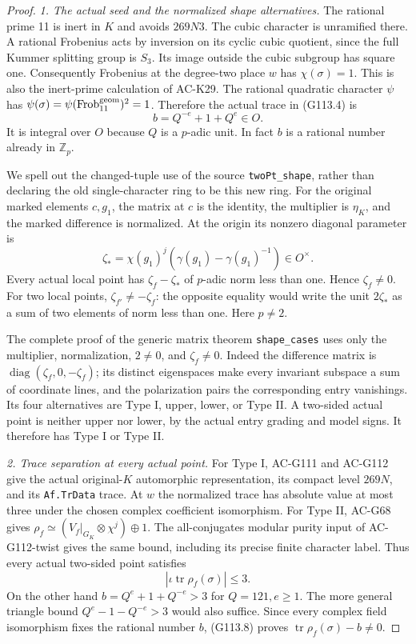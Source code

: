 \begin{proof}
\emph{1. The actual seed and the normalized shape alternatives.}
The rational prime 11 is inert in \(K\) and avoids \(269N3\).
The cubic character is unramified there.  A rational Frobenius
acts by inversion on its cyclic cubic quotient, since the full
Kummer splitting group is \(S_3\).  Its image outside the cubic
subgroup has square one.  Consequently Frobenius at the degree-two
place \(w\) has \(\chi(\sigma)=1\).  This is also the inert-prime
calculation of AC-K29.  The rational quadratic character \(\psi\)
has \(\psi(\sigma)=\psi(\mathrm{Frob}^{\rm geom}_{11})^2=1\).
Therefore the actual trace in (G113.4) is
\[
                   b=Q^{-e}+1+Q^e\in O.
 \tag{G113.6}
\]
It is integral over \(O\) because \(Q\) is a \(p\)-adic unit.
In fact \(b\) is a rational number already in \(\mathbb Z_p\).

We spell out the changed-tuple use of the source
\texttt{twoPt\_shape}, rather than declaring the old single-character
ring to be this new ring.  For the original marked elements \(c,g_1\),
the matrix at \(c\) is the identity, the multiplier is \(\eta_K\),
and the marked difference is normalized.  At the origin its nonzero
diagonal parameter is
\[
        \zeta_*=\chi(g_1)^j
                         (\gamma(g_1)-\gamma(g_1)^{-1})\in O^\times.
 \tag{G113.7}
\]
Every actual local point has \(\zeta_f-\zeta_*\) of \(p\)-adic
norm less than one.  Hence \(\zeta_f\ne0\).  For two local
points, \(\zeta_{f'}\ne-\zeta_f\): the opposite equality would
write the unit \(2\zeta_*\) as a sum of two elements of norm
less than one.  Here \(p\ne2\).

The complete proof of the generic matrix theorem
\texttt{shape\_cases} uses only the multiplier, normalization,
\(2\ne0\), and \(\zeta_f\ne0\).  Indeed the difference matrix
is \(\operatorname{diag}(\zeta_f,0,-\zeta_f)\); its distinct
eigenspaces make every invariant subspace a sum of
coordinate lines, and the polarization pairs the corresponding
entry vanishings.  Its four alternatives are Type I, upper,
lower, or Type II.  A two-sided actual point is neither upper
nor lower, by the actual entry grading and model signs.
It therefore has Type I or Type II.

\emph{2. Trace separation at every actual point.}
For Type I, AC-G111 and AC-G112 give the actual
original-\(K\) automorphic representation, its compact level
\(269N\), and its \texttt{Af.TrData} trace.  At \(w\) the
normalized trace has absolute value at most three under the
chosen complex coefficient isomorphism.  For Type II, AC-G68
gives \(\rho_f\simeq(V_f|_{G_K}\otimes\chi^j)\oplus1\).
The all-conjugates modular purity input of AC-G112-twist gives
the same bound, including its precise finite character label.
Thus every actual two-sided point satisfies
\[
           |\iota\operatorname{tr}\rho_f(\sigma)|\le3.
 \tag{G113.8}
\]
On the other hand \(b=Q^e+1+Q^{-e}>3\) for \(Q=121,e\ge1\).
The more general triangle bound \(Q^e-1-Q^{-e}>3\) would
also suffice.  Since every complex field isomorphism fixes the
rational number \(b\), (G113.8) proves
\(\operatorname{tr}\rho_f(\sigma)-b\ne0\).


\end{proof}
